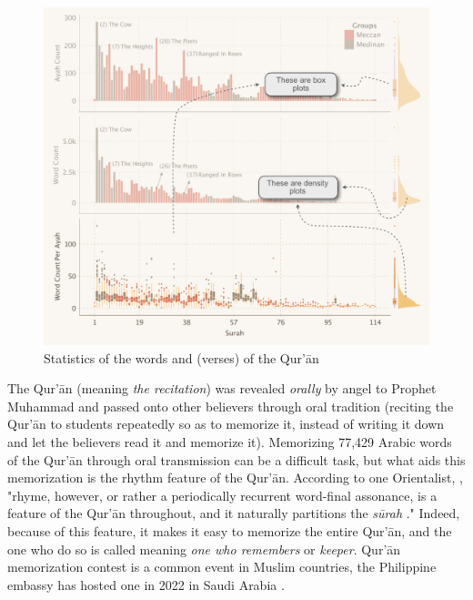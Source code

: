 \begin{figure}[!b]
    \centering
    \includegraphics[width=\textwidth]{img/plot1.pdf}
    \caption{Statistics of the words and   (verses) of the Qur'\=an}
    \label{fig:ayah_word_count}
\end{figure}

The Qur'\=an (meaning \textit{the recitation}) was revealed \textit{orally} by angel   to Prophet Muhammad  and passed onto other believers through oral tradition (reciting the Qur'\=an to students repeatedly so as to memorize it, instead of writing it down and let the believers read it and memorize it). Memorizing 77,429 Arabic words of the Qur'\=an through oral transmission can be a difficult task, but what aids this memorization is the rhythm feature of the Qur'\=an. According to one Orientalist, , "rhyme, however, or rather a periodically recurrent word-final assonance, is a feature of the Qur'\=an throughout, and it naturally partitions the \textit{s\=urah} ." Indeed, because of this feature, it makes it easy to memorize the entire Qur'\=an, and the one who do so is called   meaning \textit{one who remembers} or \textit{keeper}. Qur'\=an memorization contest is a common event in Muslim countries, the Philippine embassy has hosted one in 2022 in Saudi Arabia \cite{mb2022}.

